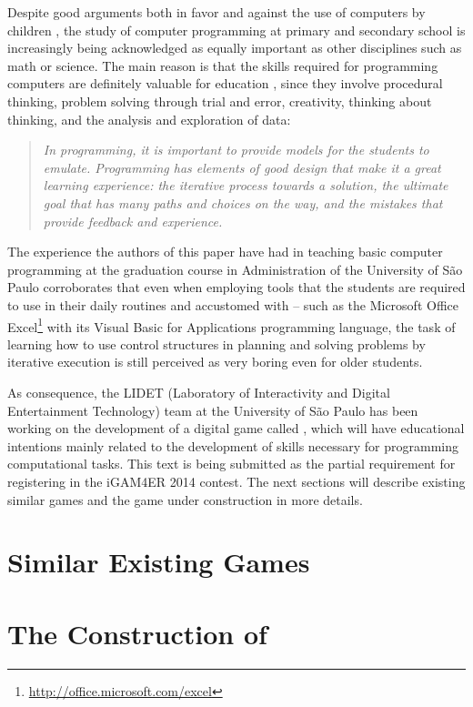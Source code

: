\documentclass{sigchi}
\begin{document}
	Despite good arguments both in favor and against the use of computers by children \cite{Istrate2010,Setzer2001}, the study of computer programming at primary and secondary school is increasingly being acknowledged as equally important as other disciplines such as math or science. The main reason is that the skills required for programming computers are definitely valuable for education \cite{Kahn1999}, since they involve procedural thinking, problem solving through trial and error, creativity, thinking about thinking, and the analysis and exploration of data:
	
	\begin{quotation}
		\noindent
		\emph{In programming, it is important to provide models for the students to emulate. Programming has elements of good design that make it a great learning experience: the iterative process towards a solution, the ultimate goal that has many paths and choices on the way, and the mistakes that provide feedback and experience.}
	\end{quotation}
	
	The experience the authors of this paper have had in teaching basic computer programming at the graduation course in Administration of the University of S\~ao Paulo corroborates that even when employing tools that the students are required to use in their daily routines and accustomed with -- such as the Microsoft Office Excel\footnote{\url{http://office.microsoft.com/excel}} with its Visual Basic for Applications programming language, the task of learning how to use control structures in planning and solving problems by iterative execution is still perceived as very boring even for older students.
	
	As consequence, the LIDET (Laboratory of Interactivity and Digital Entertainment Technology) team at the University of S\~ao Paulo has been working on the development of a digital game called \gamename, which will have educational intentions mainly related to the development of skills necessary for programming computational tasks. This text is being submitted as the partial requirement for registering in the iGAM4ER 2014 contest. The next sections will describe existing similar games and the game under construction in more details.

\section{Similar Existing Games}

\section{The Construction of \gamename}
\end{document}
